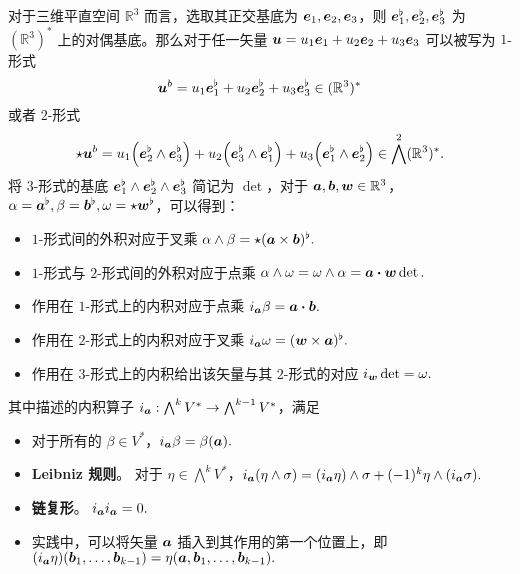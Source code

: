 \documentclass[11pt]{article}
\newcommand{\RR}{\mathbb{R}}
\begin{document}
    对于三维平直空间 $\RR^3$ 而言，选取其正交基底为 $\vb*{e}_1, \vb*{e}_2, \vb*{e}_3$，则 $\vb*{e}_1^\flat, \vb*{e}_2^\flat, \vb*{e}_3^\flat$ 为 $(\RR^3)^*$ 上的对偶基底。那么对于任一矢量 $\vb*{u} = u_1\vb*{e}_1 + u_2\vb*{e}_2 + u_3\vb*{e}_3$ 可以被写为 $1$-形式
    \[ \vb*{u}^b = u_1\vb*{e}_1^\flat + u_2\vb*{e}_2^\flat + u_3\vb*{e}_3^\flat \in (\RR^3)^* \]
    或者 $2$-形式
    \[ \star \vb*{u}^b = u_1\qty(\vb*{e}_2^\flat \wedge \vb*{e}_3^\flat) + u_2\qty(\vb*{e}_3^\flat \wedge \vb*{e}_1^\flat) + u_3\qty(\vb*{e}_1^\flat \wedge \vb*{e}_2^\flat) \in \bigwedge^2 (\RR^3)^*. \]
    将 $3$-形式的基底 $\vb*{e}_1^\flat \wedge \vb*{e}_2^\flat \wedge \vb*{e}_3^\flat$ 简记为 $\det$，对于 $\vb*{a}, \vb*{b}, \vb*{w} \in \RR^3$，$\alpha = \vb*{a}^\flat, \beta = \vb*{b}^\flat, \omega = \star \vb*{w}^\flat$，可以得到：
    \begin{itemize}
        \item $1$-形式间的外积对应于叉乘 $\alpha \wedge \beta = \star(\vb*{a} \times \vb*{b})^\flat.$
        \item $1$-形式与 $2$-形式间的外积对应于点乘 $\alpha \wedge \omega = \omega \wedge \alpha = \vb*{a} \vdot \vb*{w} \det.$
        \item 作用在 $1$-形式上的内积对应于点乘 $i_{\vb*{a}} \beta = \vb*{a} \vdot \vb*{b}.$
        \item 作用在 $2$-形式上的内积对应于叉乘 $i_{\vb*{a}} \omega = (\vb*{w} \times \vb*{a})^\flat.$
        \item 作用在 $3$-形式上的内积给出该矢量与其 $2$-形式的对应 $i_{\vb*{w}} \det = \omega.$
    \end{itemize}
    其中描述的内积算子 $i_{\vb*{a}}: \bigwedge^k V^* \to \bigwedge^{k-1} V^*$，满足
    \begin{itemize}
        \item 对于所有的 $\beta \in V^*$，$i_{\vb*{a}} \beta = \beta(\vb*{a}).$
        \item \textbf{Leibniz 规则}。 对于 $\eta \in \bigwedge^k V^*$，$i_{\vb*{a}} (\eta \wedge \sigma) = (i_{\vb*{a}}\eta) \wedge \sigma + (-1)^k \eta \wedge (i_{\vb*{a}}\sigma).$
        \item \textbf{链复形}。 $i_{\vb*{a}}i_{\vb*{a}} = 0.$
        \item 实践中，可以将矢量 $\vb*{a}$ 插入到其作用的第一个位置上，即 $(i_{\vb*{a}}\eta)(\vb*{b}_1, \ldots,\vb*{b}_{k-1}) = \eta(\vb*{a}, \vb*{b}_1, \ldots,\vb*{b}_{k-1}). $
    \end{itemize}
    
\end{document}
